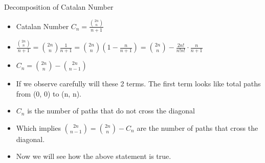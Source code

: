 \begin{frame}{Decomposition of Catalan Number}
    \begin{itemize}[<+->]
        \item Catalan Number $C_n = \frac{{2n \choose n}}{n+1}$
        \item $\frac{{2n \choose n}}{n+1} = {2n \choose n}\frac{1}{n+1} = {2n \choose n}\left(1 - \frac{n}{n+1}\right) = {2n\choose n} - \frac{2n!}{n!n!} \cdot \frac{n}{n+1}$
        \item $C_n = {2n \choose n} - {2n \choose n-1} $
        \item If we observe carefully will these 2 terms. The first term looks like total paths from (0, 0) to (n, n).
        \item $C_n$ is the number of paths that do not cross the diagonal
        \item Which implies ${2n \choose n-1} = {2n \choose n} - C_n$ are the number of paths that cross the diagonal.
        \item Now we will see how the above statement is true.
    \end{itemize}
\end{frame}